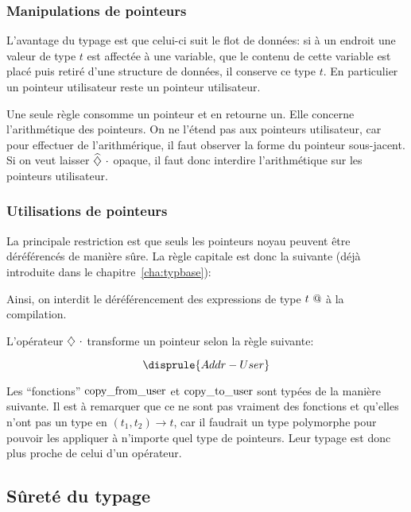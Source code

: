 \subsubsection*{Manipulations de pointeurs}

L'avantage du typage est que celui-ci suit le flot de données: si à un endroit
une valeur de type $t$ est affectée à une variable, que le contenu de cette
variable est placé puis retiré d'une structure de données, il conserve ce type
$t$. En particulier un pointeur utilisateur reste un pointeur utilisateur.

Une seule règle consomme un pointeur et en retourne un. Elle concerne
l'arithmétique des pointeurs. On ne l'étend pas aux pointeurs utilisateur, car
pour effectuer de l'arithmérique, il faut observer la forme du pointeur
sous-jacent. Si on veut laisser $\phx\vTainted$ opaque, il faut donc interdire
l'arithmétique sur les pointeurs utilisateur.

\subsubsection*{Utilisations de pointeurs}

La principale restriction est que seuls les pointeurs noyau peuvent être
déréférencés de manière sûre. La règle capitale est donc la suivante (déjà
introduite dans le chapitre~\ref{cha:typbase}):

\begin{mathpar}
\end{mathpar}

Ainsi, on interdit le déréférencement des expressions de type $\ptrU{t}$ à la
compilation.

L'opérateur $\eTaint{\cdot}$ transforme un pointeur selon la règle suivante:

\[
    \disprule{Addr-User}
\]

Les \enquote{fonctions} $\cfuF$ et $\ctuF$ sont typées de la manière suivante.
Il est à remarquer que ce ne sont pas vraiment des fonctions et qu'elles n'ont
pas un type en $(t_1, t_2) → t$, car il faudrait un type polymorphe pour pouvoir
les appliquer à n'importe quel type de pointeurs. Leur typage est donc plus
proche de celui d'un opérateur.

\begin{mathpar}

\end{mathpar}

\subsection{Sûreté du typage}

